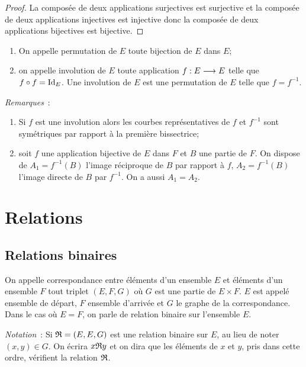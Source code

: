 \begin{proof}
  La composée de deux applications surjectives est surjective et la composée de
  deux applications injectives est injective donc la composée de deux applications
  bijectives est bijective.
\end{proof}

\begin{defdef}
  \begin{enumerate}
    \item On appelle permutation de \(E\) toute bijection de \(E\) dans \(E\);
    \item on appelle involution de \(E\) toute application
      \(f:E \longrightarrow{} E\) telle que \(f \circ f = \operatorname{Id}_E\). Une
      involution de \(E\) est une permutation de \(E\) telle que
      \(f = f^{-1}\).
  \end{enumerate}
\end{defdef}

\emph{Remarques}~:
\begin{enumerate}
  \item Si \(f\) est une involution alors les courbes représentatives de \(f\)
    et \(f^{-1}\) sont symétriques par rapport à la première bissectrice;
  \item soit \(f\) une application bijective de \(E\) dans \(F\) et \(B\) une
    partie de \(F\). On dispose de \(A_1 = f^{-1}(B)\) l'image réciproque de
    \(B\) par rapport à \(f\), \(A_2 = f^{-1}(B)\) l'image directe de \(B\)
    par \(f^{-1}\). On a aussi \(A_1 = A_2\).
\end{enumerate}

\section{Relations}\label{chap3-sec:relations}

\subsection{Relations binaires}\label{chap3-subsec:relationbinaire}

\begin{defdef}
  On appelle correspondance entre éléments d'un ensemble \(E\) et éléments
  d'un ensemble \(F\) tout triplet \((E, F, G)\) où \(G\) est une partie de \(E
  \times F\). \(E\) est appelé ensemble de départ, \(F\) ensemble d'arrivée et
  \(G\) le graphe de la correspondance. Dans le cas où \(E = F\), on parle de
  relation binaire sur l'ensemble \(E\).
\end{defdef}
\emph{Notation}~: Si \(\mathfrak{R} = (E, E, G)\) est une relation binaire sur \(E\),
au lieu de noter \((x, y) \in{}G\). On écrira \(x\mathfrak{R}{}y\) et on dira que les
éléments de \(x\) et \(y\), pris dans cette ordre, vérifient la relation
\(\mathfrak{R}\).

